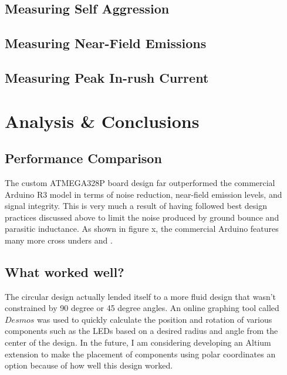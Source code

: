 \documentclass{article}
\newcommand*{\Indent}{\hspace*{1cm}}
\begin{document}
\subsection{Measuring Self Aggression}

\subsection{Measuring Near-Field Emissions}

\subsection{Measuring Peak In-rush Current}

\section{Analysis \& Conclusions}
\subsection{Performance Comparison}
\Indent The custom ATMEGA328P board design far outperformed the commercial Arduino R3 model in terms of noise reduction, near-field emission levels, and signal integrity. This is very much a result of having followed best design practices discussed above to limit the noise produced by ground bounce and parasitic inductance. As shown in figure x, the commercial Arduino features many more cross unders and . 

\subsection{What worked well?}
\Indent The circular design actually lended itself to a more fluid design that wasn't constrained by 90 degree or 45 degree angles. An online graphing tool called $Desmos$ was used to quickly calculate the position and rotation of various components such as the LEDs based on a desired radius and angle from the center of the design. In the future, I am considering developing an Altium extension to make the placement of components using polar coordinates an option because of how well this design worked.
\end{document}
